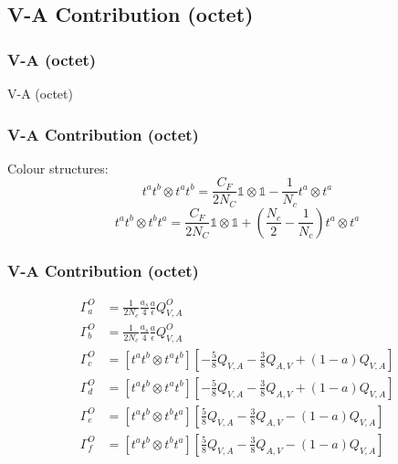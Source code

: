 \documentclass{beamer}
\begin{document}
\subsection{V-A Contribution (octet)}
\begin{frame}
\frametitle{V-A (octet)}
\huge\centering
V-A (octet)
\end{frame}

\begin{frame}
\frametitle{V-A Contribution (octet)}
Colour structures:
\begin{equation*}
t^a t^b \otimes t^a t^b = \frac{C_F}{2N_C}\mathds{1}\otimes\mathds{1} - \frac{1}{N_c}t^a \otimes t^a
\end{equation*}	
\begin{equation*}
t^at^b \otimes t^b t^a = \frac{C_F}{2N_C} \mathds{1} \otimes \mathds{1} + \left( \frac{N_c}{2} - \frac{1}{N_c}\right  ) t^a \otimes t^a
\end{equation*}
\end{frame}

\begin{frame}
\frametitle{V-A Contribution (octet)} 
\begin{equation*}
\begin{split}
	\Gamma^O_a &= \frac{1}{2N_c} \frac{a_s}{4} \frac{a}{\epsilon} Q^O_{V,A}  \\
	\Gamma^O_b &= \frac{1}{2N_c} \frac{a_s}{4} \frac{a}{\epsilon} Q^O_{V,A}  \\
	\Gamma^O_c &= [t^a t^b \otimes t^a t^b ] \left[-\frac{5}{8}Q_{V,A} - \frac{3}{8} Q_{A,V} + (1-a) Q_{V,A}\right]  \\
	\Gamma^O_d &= [t^a t^b \otimes t^a t^b ] \left[-\frac{5}{8}Q_{V,A} - \frac{3}{8} Q_{A,V} + (1-a) Q_{V,A}\right]  \\
	\Gamma^O_e &= \left[ t^a t^b \otimes t^b t^a \right ] \left[\frac{5}{8}Q_{V,A} - \frac{3}{8}Q_{A,V} - (1-a)Q_{V,A}\right]  \\
	\Gamma^O_f &= \left[ t^a t^b \otimes t^b t^a \right ] \left[\frac{5}{8}Q_{V,A} - \frac{3}{8}Q_{A,V} - (1-a)Q_{V,A}\right] 
\end{split}
\end{equation*}
\end{frame}
\end{document}
